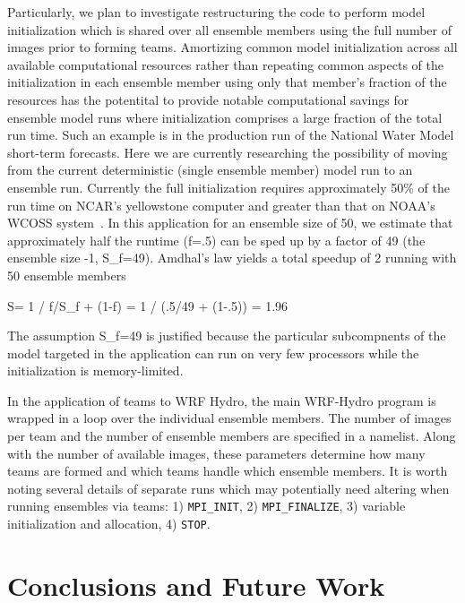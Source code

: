 Particularly, we plan to investigate restructuring the code to perform
model initialization which is shared over all ensemble members using
the full number of images prior to forming teams. Amortizing common
model initialization across all available computational resources
rather than repeating common aspects of the initialization in each
ensemble member using only that member's fraction of the resources has
the potentital to provide notable computational savings for
ensemble model runs where initialization comprises a large fraction of
the total run time. Such an example is in the production run of the
National Water Model short-term forecasts. Here we are currently
researching the possibility of moving from the current deterministic
(single ensemble member) model run to an ensemble run. Currently the
full initialization requires approximately 50\% of the run time on
NCAR's yellowstone computer and greater than that on NOAA's WCOSS
system~\cite{yuetal2017}. In this application for an ensemble size of 50, we estimate that
approximately half the runtime (f=.5) can be sped up by a factor of
49 (the ensemble size -1, S_f=49). Amdhal's law yields a total speedup
of 2 running with 50 ensemble members

S= 1 / { f/S_f + (1-f) } = 1 / (.5/49 + (1-.5)) = 1.96

The assumption S_f=49 is justified because the particular subcompnents of
the model targeted in the application can run on very few processors while the
initialization is memory-limited. 

In the application of teams to WRF Hydro, the main WRF-Hydro program is wrapped in a loop
over the individual ensemble members. The number of images per team and the
 number of ensemble members are specified in a namelist. Along with
 the number of available images, these parameters determine how many
 teams are formed and which teams handle which ensemble members. It is
 worth noting several details of separate runs which may potentially need altering
 when running ensembles via teams: 1) \texttt{MPI\_INIT}, 2) \texttt{MPI\_FINALIZE}, 3)
 variable initialization and allocation, 4) \texttt{STOP}.


\section{Conclusions and Future Work}\label{sec:conclusions}



